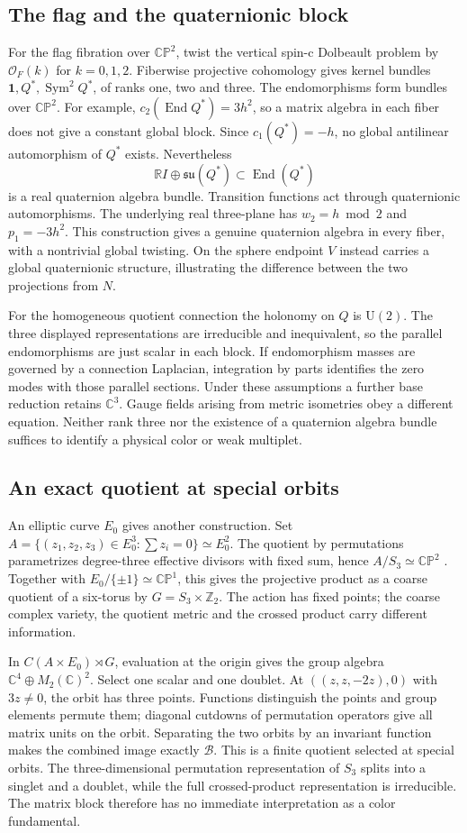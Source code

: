 \documentclass[11pt,oneside]{article}
\newcommand{\C}{\mathbb C}
\newcommand{\R}{\mathbb R}
\newcommand{\Z}{\mathbb Z}
\newcommand{\CP}{\mathbb{CP}}
\newcommand{\End}{\operatorname{End}}
\newcommand{\su}{\mathfrak{su}}
\newcommand{\unit}{\mathbf{1}}
\newcommand{\U}{\mathrm U}
\newcommand{\OO}{\mathcal O}
\newcommand{\Sym}{\operatorname{Sym}}
\begin{document}
\subsection*{The flag and the quaternionic block}
For the flag fibration over \(\CP^2\), twist the vertical spin-c Dolbeault problem by \(\OO_F(k)\) for \(k=0,1,2\). Fiberwise projective cohomology gives kernel bundles \(\unit,Q^*,\Sym^2Q^*\), of ranks one, two and three. The endomorphisms form bundles over \(\CP^2\). For example, \(c_2(\End Q^*)=3h^2\), so a matrix algebra in each fiber does not give a constant global block. Since \(c_1(Q^*)=-h\), no global antilinear automorphism of \(Q^*\) exists. Nevertheless
\[
 \R I\oplus\su(Q^*)\subset\End(Q^*)
\]
is a real quaternion algebra bundle. Transition functions act through quaternionic automorphisms. The underlying real three-plane has \(w_2=h\bmod2\) and \(p_1=-3h^2\). This construction gives a genuine quaternion algebra in every fiber, with a nontrivial global twisting. On the sphere endpoint \(V\) instead carries a global quaternionic structure, illustrating the difference between the two projections from \(N\).

For the homogeneous quotient connection the holonomy on \(Q\) is \(\U(2)\). The three displayed representations are irreducible and inequivalent, so the parallel endomorphisms are just scalar in each block. If endomorphism masses are governed by a connection Laplacian, integration by parts identifies the zero modes with those parallel sections. Under these assumptions a further base reduction retains \(\C^3\). Gauge fields arising from metric isometries obey a different equation. Neither rank three nor the existence of a quaternion algebra bundle suffices to identify a physical color or weak multiplet.

\subsection*{An exact quotient at special orbits}
An elliptic curve \(E_0\) gives another construction. Set \(A=\{(z_1,z_2,z_3)\in E_0^3:\sum z_i=0\}\simeq E_0^2\). The quotient by permutations parametrizes degree-three effective divisors with fixed sum, hence \(A/S_3\simeq\CP^2\) \cite{symcurve}. Together with \(E_0/\{\pm1\}\simeq\CP^1\), this gives the projective product as a coarse quotient of a six-torus by \(G=S_3\times\Z_2\). The action has fixed points; the coarse complex variety, the quotient metric and the crossed product carry different information.

In \(C(A\times E_0)\rtimes G\), evaluation at the origin gives the group algebra \(\C^4\oplus M_2(\C)^2\). Select one scalar and one doublet. At \(((z,z,-2z),0)\) with \(3z\ne0\), the orbit has three points. Functions distinguish the points and group elements permute them; diagonal cutdowns of permutation operators give all matrix units on the orbit. Separating the two orbits by an invariant function makes the combined image exactly \(\mathcal B\). This is a finite quotient selected at special orbits. The three-dimensional permutation representation of \(S_3\) splits into a singlet and a doublet, while the full crossed-product representation is irreducible. The matrix block therefore has no immediate interpretation as a color fundamental.
\end{document}
